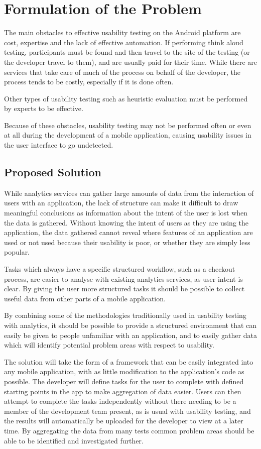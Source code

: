 \chapter{Formulation of the Problem}

The main obstacles to effective usability testing on the Android
platform are cost, expertise and the lack of effective automation.
If performing think aloud testing, participants must be found and
then travel to the site of the testing (or the developer travel to
them), and are usually paid for their time.  While there are services
that take care of much of the process on behalf of the developer,
the process tends to be costly, especially if it is done often.

Other types of usability testing such as heuristic evaluation must
be performed by experts to be effective.

Because of these obstacles, usability testing may not be performed
often or even at all during the development of a mobile application,
causing usability issues in the user interface to go undetected.


\section{Proposed Solution}

While analytics services can gather large amounts of data from the
interaction of users with an application, the lack of structure can
make it difficult to draw meaningful conclusions as information
about the intent of the user is lost when the data is gathered.
Without knowing the intent of users as they are using the application,
the data gathered cannot reveal where features of an application
are used or not used because their usability is poor, or whether
they are simply less popular.

Tasks which always have a specific structured workflow, such as a
checkout process, are easier to analyse with existing analytics
services, as user intent is clear. By giving the user more structured
tasks it should be possible to collect useful data from other parts
of a mobile application.

By combining some of the methodologies traditionally used in usability
testing with analytics, it should be possible to provide a structured
environment that can easily be given to people unfamiliar with an
application, and to easily gather data which will identify potential
problem areas with respect to usability.

The solution will take the form of a framework that can be easily
integrated into any mobile application, with as little modification
to the application's code as possible. The developer will define
tasks for the user to complete with defined starting points in the
app to make aggregation of data easier. Users can then attempt to
complete the tasks independently without there needing to be a
member of the development team present, as is usual with usability
testing, and the results will automatically be uploaded for the
developer to view at a later time. By aggregating the data from
many tests common problem areas should be able to be identified and
investigated further.
